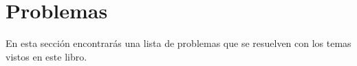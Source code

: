 \chapter*{Problemas}

En esta sección encontrarás una lista de problemas que se resuelven con los temas vistos en este libro.

\startproblemlist
\renewcommand{\problemgroup}{E}

\problemtitle 

\problembreak

\problemtitle 

\problembreak

\problemtitle 